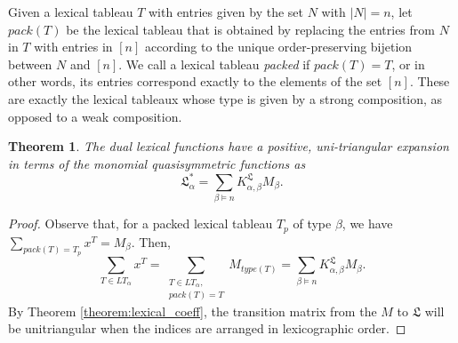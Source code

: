 \documentclass{amsart}
\newtheorem{theorem}{Theorem}[section]
\theoremstyle{definition}
\newcommand{\lx}{\mathfrak{L}}
\begin{document}
 Given a lexical tableau $T$ with entries given by the set $N$ with $|N|=n$, let $pack(T)$ be the lexical tableau that is
 obtained by replacing the entries from $N$ in $T$ with entries in $[n]$ according to the unique order-preserving bijetion between $N$ and $[n]$. We call a lexical tableau \emph{packed} if $pack(T) = T$, or in other words, its entries correspond exactly to the elements of the set $[n]$. These are exactly the lexical tableaux whose type is given by a strong composition, as opposed to a weak composition.

\begin{theorem}\label{theoremlxstarM}
The dual lexical functions have a positive, uni-triangular expansion in terms of the monomial quasisymmetric functions as \[ \lx_{\alpha}^* = \sum_{\beta \vDash n} K^{\lx}_{\alpha, \beta} M_{\beta}.\] 
\end{theorem}

\begin{proof} 
Observe that, for a packed lexical tableau $T_p$ of type $\beta$, we have $\sum_{pack(T) = T_p} x^T = M_{\beta}$. Then, \[\sum_{T \in LT_{\alpha}} x^T = \sum_{\substack{T \in LT_{\alpha},\\ pack(T) = T}} M_{type(T)} = \sum_{\beta \vDash 
 n} K^{\lx}_{\alpha,\beta} M_{\beta}.\] By Theorem \ref{theorem:lexical_coeff}, the transition matrix from the $M$ to $\lx$ will be unitriangular when the indices are arranged in lexicographic order.
\end{proof}
\end{document}
